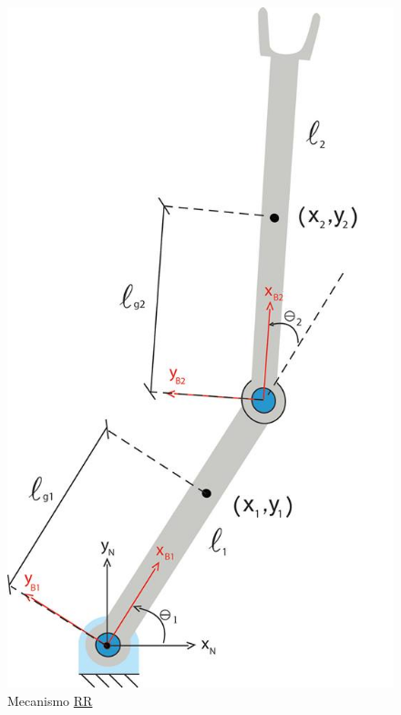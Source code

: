 \documentclass[a4paper,11pt,brazil,fleqn]{article}
\begin{document}
\begin{figure}[H]
	\centering
	\includegraphics[scale=0.3]{RR.jpg}  
	\caption{Mecanismo \underline{R}\underline{R}}
	\label{fig:RR}
\end{figure}
\end{document}
